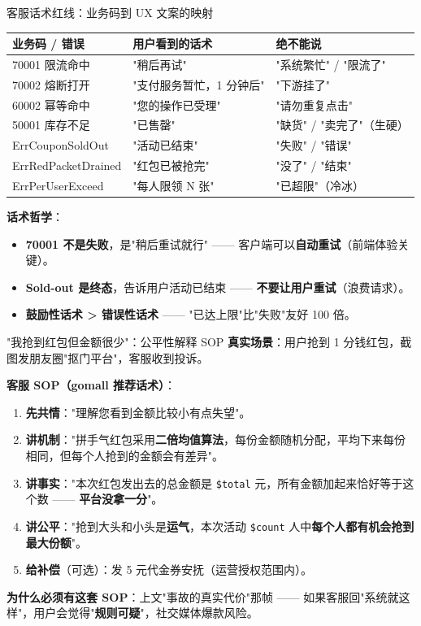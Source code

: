 \documentclass[aspectratio=169,11pt]{beamer}
\begin{document}
\begin{frame}[shrink]{客服话术红线：业务码到 UX 文案的映射}
\begin{tabular}{@{}lll@{}}
\toprule
业务码 / 错误 & 用户看到的话术 & \textbf{绝不能说} \\
\midrule
70001 限流命中    & "稍后再试" & "系统繁忙" / "限流了" \\
70002 熔断打开    & "支付服务暂忙，1 分钟后" & "下游挂了" \\
60002 幂等命中    & "您的操作已受理" & "请勿重复点击" \\
50001 库存不足    & "已售罄" & "缺货" / "卖完了"（生硬）\\
ErrCouponSoldOut  & "活动已结束" & "失败" / "错误" \\
ErrRedPacketDrained & "红包已被抢完" & "没了" / "结束" \\
ErrPerUserExceed  & "每人限领 N 张" & "已超限"（冷冰）\\
\bottomrule
\end{tabular}
\vspace{2mm}
\small \textbf{话术哲学}：
\begin{itemize}\itemsep0pt
  \item \textbf{70001 不是失败}，是"稍后重试就行" —— 客户端可以\textbf{自动重试}（前端体验关键）。
  \item \textbf{Sold-out 是终态}，告诉用户活动已结束 —— \textbf{不要让用户重试}（浪费请求）。
  \item \textbf{鼓励性话术 > 错误性话术} —— "已达上限"比"失败"友好 100 倍。
\end{itemize}
\end{frame}

\begin{frame}[shrink]{"我抢到红包但金额很少"：公平性解释 SOP}
\textbf{真实场景}：用户抢到 1 分钱红包，截图发朋友圈"抠门平台"，客服收到投诉。

\vspace{2mm}
\textbf{客服 SOP（gomall 推荐话术）}：
\begin{enumerate}\itemsep1pt
  \item \textbf{先共情}："理解您看到金额比较小有点失望"。
  \item \textbf{讲机制}："拼手气红包采用\textbf{二倍均值算法}，每份金额随机分配，平均下来每份相同，但每个人抢到的金额会有差异"。
  \item \textbf{讲事实}："本次红包发出去的总金额是 \texttt{\${total}} 元，所有金额加起来恰好等于这个数 —— \textbf{平台没拿一分}"。
  \item \textbf{讲公平}："抢到大头和小头是\textbf{运气}，本次活动 \texttt{\${count}} 人中\textbf{每个人都有机会抢到最大份额}"。
  \item \textbf{给补偿}（可选）：发 5 元代金券安抚（运营授权范围内）。
\end{enumerate}
\vspace{2mm}

\small \textbf{为什么必须有这套 SOP}：上文"事故的真实代价"那帧 —— 如果客服回"系统就这样"，用户会觉得"\textbf{规则可疑}"，社交媒体爆款风险。
\end{frame}
\end{document}
